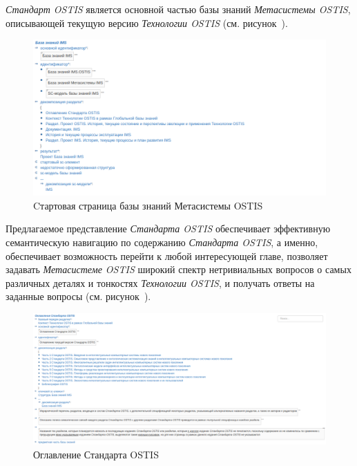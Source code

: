 \textit{Стандарт OSTIS} является основной частью базы знаний \textit{Метасистемы OSTIS}, описывающей текущую версию \textit{Технологии OSTIS} (см. рисунок~\textit{}).

\begin{figure}[H]
	\includegraphics[scale=0.8, width=1.0\textwidth]{images/part7/chapter_ims_standard/ims_main_page.png}
	\caption{Cтартовая страница базы знаний Метасистемы OSTIS}
	\label{fig:main_page}
\end{figure}

Предлагаемое представление \textit{Стандарта OSTIS} обеспечивает эффективную семантическую навигацию по содержанию \textit{Стандарта OSTIS}, а именно, обеспечивает возможность перейти к любой интересующей главе, позволяет задавать \textit{Метасистеме OSTIS} широкий спектр нетривиальных вопросов о самых различных деталях и тонкостях \textit{Технологии OSTIS}, и получать ответы на заданные вопросы (см. рисунок~\textit{}). 

\begin{figure}[H]
	\includegraphics[scale=0.8, width=1.0\textwidth]{images/part7/chapter_ims_standard/table_of_contents.png}
	\caption{Оглавление Стандарта OSTIS}
	\label{fig:table_of_contents}
\end{figure}

